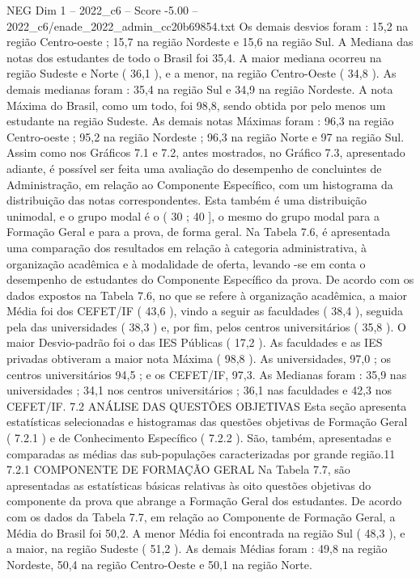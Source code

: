 \begin{textsample}{NEG Dim 1 – 2022\_c6 – Score -5.00 – 2022\_c6/enade\_2022\_admin\_cc20b69854.txt}
Os demais desvios foram : 15,2 na região Centro-oeste ; 15,7 na região Nordeste e 15,6 na região Sul.
A Mediana das notas dos estudantes de todo o Brasil foi 35,4.
A maior mediana ocorreu na região Sudeste e Norte ( 36,1 ), e a menor, na região Centro-Oeste ( 34,8 ).
As demais medianas foram : 35,4 na região Sul e 34,9 na região Nordeste.
A nota Máxima do Brasil, como um todo, foi 98,8, sendo obtida por pelo menos um estudante na região Sudeste.
As demais notas Máximas foram : 96,3 na região Centro-oeste ; 95,2 na região Nordeste ; 96,3 na região Norte e 97 na região Sul.
Assim como nos Gráficos 7.1 e 7.2, antes mostrados, no Gráfico 7.3, apresentado adiante, é possível ser feita uma avaliação do desempenho de concluintes de Administração, em relação ao Componente Específico, com um histograma da distribuição das notas correspondentes.
Esta também é uma distribuição unimodal, e o grupo modal é o ( 30 ; 40 ], o mesmo do grupo modal para a Formação Geral e para a prova, de forma geral.
Na Tabela 7.6, é apresentada uma comparação dos resultados em relação à categoria administrativa, à organização acadêmica e à modalidade de oferta, levando -se em conta o desempenho de estudantes do Componente Específico da prova.
De acordo com os dados expostos na Tabela 7.6, no que se refere à organização acadêmica, a maior Média foi dos CEFET/IF ( 43,6 ), vindo a seguir as faculdades ( 38,4 ), seguida pela das universidades ( 38,3 ) e, por fim, pelos centros universitários ( 35,8 ).
O maior Desvio-padrão foi o das IES Públicas ( 17,2 ).
As faculdades e as IES privadas obtiveram a maior nota Máxima ( 98,8 ).
As universidades, 97,0 ; os centros universitários 94,5 ; e os CEFET/IF, 97,3.
As Medianas foram : 35,9 nas universidades ; 34,1 nos centros universitários ; 36,1 nas faculdades e 42,3 nos CEFET/IF. 7.2 ANÁLISE DAS QUESTÕES OBJETIVAS Esta seção apresenta estatísticas selecionadas e histogramas das questões objetivas de Formação Geral ( 7.2.1 ) e de Conhecimento Específico ( 7.2.2 ).
São, também, apresentadas e comparadas as médias das sub-populações caracterizadas por grande região.11 7.2.1 COMPONENTE DE FORMAÇÃO GERAL Na Tabela 7.7, são apresentadas as estatísticas básicas relativas às oito questões objetivas do componente da prova que abrange a Formação Geral dos estudantes.
De acordo com os dados da Tabela 7.7, em relação ao Componente de Formação Geral, a Média do Brasil foi 50,2.
A menor Média foi encontrada na região Sul ( 48,3 ), e a maior, na região Sudeste ( 51,2 ).
As demais Médias foram : 49,8 na região Nordeste, 50,4 na região Centro-Oeste e 50,1 na região Norte.

\end{textsample}
